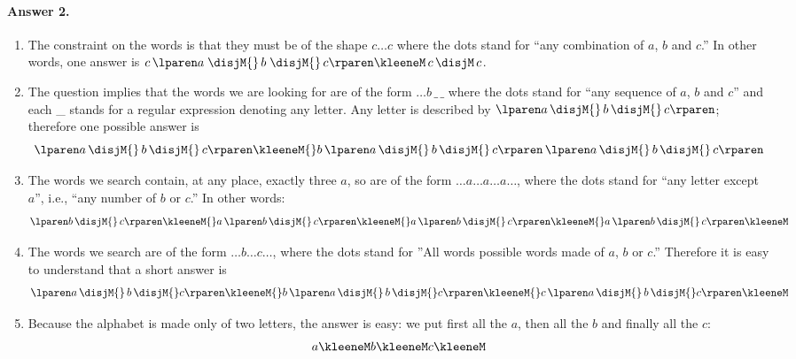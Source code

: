 \paragraph{Answer 2.}

\begin{enumerate}

  \item The constraint on the words is that they must be of the shape
    \(c \ldots c\) where the dots stand for ``any combination of
    \(a\), \(b\) and \(c\).'' In other words, one answer is \(c \,
    \lparen a \; \disjM{} \, b \; \disjM{} \, c\rparen\kleeneM \, c \,
    \disjM \, c\).

  \item The question implies that the words we are looking for are of
    the form \(\ldots b \, \_ \, \_\) where the dots stand for ``any
    sequence of \(a\), \(b\) and \(c\)'' and each \_ stands for a
    regular expression denoting any letter. Any letter is described by
    \(\lparen a \, \disjM{} \, b \, \disjM{} \, c\rparen\); therefore
    one possible answer is \[\lparen a \, \disjM{} \, b \, \disjM{} \,
    c\rparen\kleeneM{} b \, \lparen a \, \disjM{} \, b \, \disjM{} \,
    c\rparen \, \lparen a \, \disjM{} \, b \, \disjM{} \,c\rparen\]

  \item The words we search contain, at any place, exactly three
    \(a\), so are of the form \(\ldots a \ldots a \ldots a \ldots\),
    where the dots stand for ``any letter except \(a\)'', i.e., ``any
    number of \(b\) or \(c\).'' In other words: \[\lparen b \,
    \disjM{} \, c\rparen\kleeneM{} a \, \lparen b \, \disjM{} \,
    c\rparen\kleeneM{} a \, \lparen b \, \disjM{} \,
    c\rparen\kleeneM{} a \, \lparen b \, \disjM{} \,
    c\rparen\kleeneM\]

  \item The words we search are of the form \(\ldots b \ldots
      c \ldots\), where the dots stand for ''All words possible words
      made of \(a\), \(b\) or \(c\).'' Therefore it is easy to
      understand that a short answer is \[\lparen a \, \disjM{} \, b
      \, \disjM{} c\rparen\kleeneM{} b \, \lparen a \, \disjM{} \, b
      \, \disjM{} c\rparen\kleeneM{} c \, \lparen a \, \disjM{} \, b
      \, \disjM{} c\rparen\kleeneM\]

    \item Because the alphabet is made only of two letters, the
      answer is easy: we put first all the \(a\), then all the 
      \(b\) and finally all the \(c\): \[a\kleeneM b\kleeneM
      c\kleeneM\]

  \end{enumerate}
